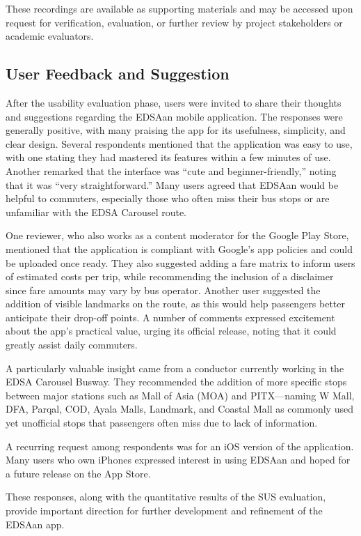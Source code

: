 \documentclass{icsthesis}
\begin{document}
\begin{mainmatter}
These recordings are available as supporting materials and may be accessed upon request for verification, evaluation, or further review by project stakeholders or academic evaluators.

\subsection{User Feedback and Suggestion}
After the usability evaluation phase, users were invited to share their thoughts and suggestions regarding the EDSAan mobile application. The responses were generally positive, with many praising the app for its usefulness, simplicity, and clear design. Several respondents mentioned that the application was easy to use, with one stating they had mastered its features within a few minutes of use. Another remarked that the interface was “cute and beginner-friendly,” noting that it was “very straightforward.” Many users agreed that EDSAan would be helpful to commuters, especially those who often miss their bus stops or are unfamiliar with the EDSA Carousel route.

One reviewer, who also works as a content moderator for the Google Play Store, mentioned that the application is compliant with Google’s app policies and could be uploaded once ready. They also suggested adding a fare matrix to inform users of estimated costs per trip, while recommending the inclusion of a disclaimer since fare amounts may vary by bus operator. Another user suggested the addition of visible landmarks on the route, as this would help passengers better anticipate their drop-off points. A number of comments expressed excitement about the app’s practical value, urging its official release, noting that it could greatly assist daily commuters.

A particularly valuable insight came from a conductor currently working in the EDSA Carousel Busway. They recommended the addition of more specific stops between major stations such as Mall of Asia (MOA) and PITX—naming W Mall, DFA, Parqal, COD, Ayala Malls, Landmark, and Coastal Mall as commonly used yet unofficial stops that passengers often miss due to lack of information.

A recurring request among respondents was for an iOS version of the application. Many users who own iPhones expressed interest in using EDSAan and hoped for a future release on the App Store.

These responses, along with the quantitative results of the SUS evaluation, provide important direction for further development and refinement of the EDSAan app.
		

\end{mainmatter}
\end{document}
